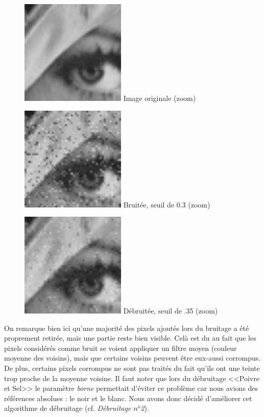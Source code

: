 \documentclass{article}
\begin{document}
		\begin{figure}[!ht]
			\centering
			\begin{minipage}[t]{5cm}
				\centering
				\includegraphics[width=5cm,height=5cm]{lenaZOOM.jpg}
				Image originale (zoom)
			\end{minipage}
			\begin{minipage}[t]{5cm}
				\centering
				\includegraphics[width=5cm,height=5cm]{Additive/noisy_30_ZOOM.jpg}
				Bruitée, seuil de 0.3 (zoom)
			\end{minipage}
			\begin{minipage}[t]{5cm}
				\centering
				\includegraphics[width=5cm,height=5cm]{Additive/algo1_30_ZOOM.jpg}
				Débruitée, seuil de .35 (zoom)
			\end{minipage}
		\end{figure}
		On remarque bien ici qu'une majorité des pixels ajoutés lors du bruitage a été proprement retirée, mais une partie reste bien visible. Celà est du au fait que les pixels considérés comme bruit se voient appliquer un filtre moyen (couleur moyenne des voisins), mais que certains voisins peuvent être eux-aussi corrompus. De plus, certains pixels corrompus ne sont pas traités du fait qu'ils ont une teinte trop proche de la moyenne voisine. Il faut noter que lors du débruitage <<Poivre et Sel>> le paramètre \emph{borne} permettait d'éviter ce problème car nous avions des références absolues : le noir et le blanc. Nous avons donc décidé d'améliorer cet algorithme de débruitage (cf. \emph{Débruitage \begin{math}n^o\end{math}2}).\\\\
		
\end{document}
